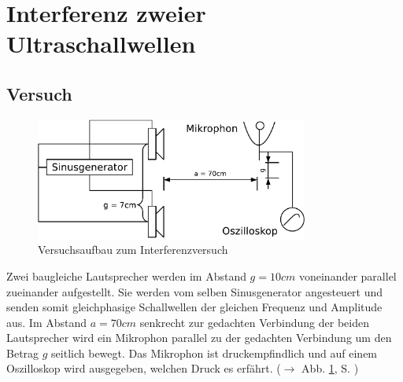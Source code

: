 % 
% 
% 
% 
% 
% 
% 
% 


			\section{Interferenz zweier Ultraschallwellen}

		\subsection{Versuch}
\label{kap_interferenz_versuch}

\begin{figure}
   \centering
   \includegraphics[width=0.8\textwidth]{praktika/mat_praktika/interferenz}
   \caption{Versuchsaufbau zum Interferenzversuch}
   \label{img_aufbau_interferenz}
\end{figure}


Zwei baugleiche Lautsprecher werden im Abstand \(g = 10cm\) voneinander parallel zueinander aufgestellt. Sie werden vom selben Sinusgenerator angesteuert und senden somit gleichphasige Schallwellen der gleichen Frequenz und Amplitude aus. Im Abstand \(a = 70cm\) senkrecht zur gedachten Verbindung der beiden Lautsprecher wird ein Mikrophon parallel zu der gedachten Verbindung um den Betrag \(g\) seitlich bewegt. Das Mikrophon ist druckempfindlich und auf einem Oszilloskop wird ausgegeben, welchen Druck es erfährt. (\(\rightarrow\) Abb. \ref{img_aufbau_interferenz}, S. \pageref{img_aufbau_interferenz})


